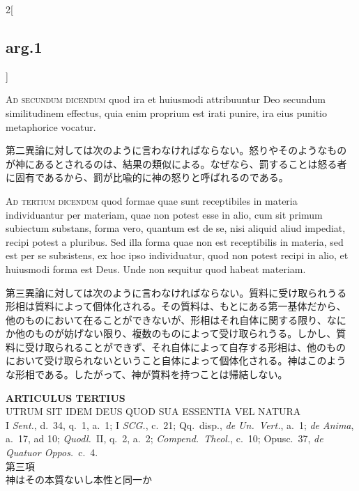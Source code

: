 \documentclass[paper=a4paper,fontsize=10pt,jafontsize=9pt,titlepage]{jlreq}
\begin{document}
\begin{paracol}{2}[\subsection{arg.1}]
\switchcolumn*[\subsection{ad.2}]

\textsc{Ad secundum dicendum} quod ira et huiusmodi attribuuntur Deo
secundum similitudinem effectus, quia enim proprium est irati punire,
ira eius punitio metaphorice vocatur.

\switchcolumn

第二異論に対しては次のように言わなければならない。怒りやそのようなもの
が神にあるとされるのは、結果の類似による。なぜなら、罰することは怒る者
に固有であるから、罰が比喩的に神の怒りと呼ばれるのである。

\switchcolumn*[\subsection{ad.3}]

\textsc{Ad tertium dicendum} quod formae quae sunt receptibiles in
materia individuantur per materiam, quae non potest esse in alio, cum
sit primum subiectum substans, forma vero, quantum est de se, nisi
aliquid aliud impediat, recipi potest a pluribus. Sed illa forma quae
non est receptibilis in materia, sed est per se subsistens, ex hoc
ipso individuatur, quod non potest recipi in alio, et huiusmodi forma
est Deus. Unde non sequitur quod habeat materiam.

\switchcolumn

第三異論に対しては次のように言わなければならない。質料に受け取られうる
形相は質料によって個体化される。その質料は、もとにある第一基体だから、
他のものにおいて在ることができないが、形相はそれ自体に関する限り、なに
か他のものが妨げない限り、複数のものによって受け取られうる。しかし、質
料に受け取られることができず、それ自体によって自存する形相は、他のもの
において受け取られないということ自体によって個体化される。神はこのよう
な形相である。したがって、神が質料を持つことは帰結しない。

\end{paracol}


\newpage
{}
{}
\setcounter{section}{3}
\setcounter{subsection}{0}

\begin{center}
 {\Large {\bfseries ARTICULUS TERTIUS}}\\
 {\large UTRUM SIT IDEM DEUS QUOD SUA ESSENTIA VEL NATURA}\\
 {\footnotesize I \textit{Sent.}, d.~34, q.~1, a.~1; I \textit{SCG.},
 c.~21; Qq.~disp., \textit{de Un.~Vert.}, a.~1; \textit{de Anima},
 a.~17, ad 10; \textit{Quodl.}~II, q.~2, a.~2; \textit{Compend.~Theol.},
 c.~10; Opusc.~37, \textit{de Quatuor Oppos.}~c.~4.}\\
{\Large 第三項\\神はその本質ないし本性と同一か}

\end{center}
\end{document}
